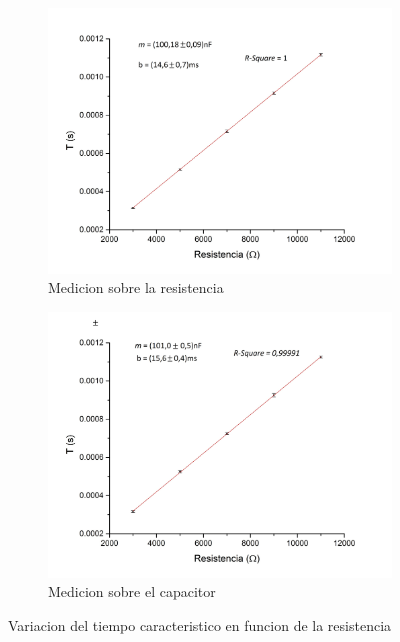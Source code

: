 \documentclass[11pt,a4paper]{article}
\begin{document}
\begin{figure}[H]

\begin{subfigure}{0.5\textwidth}
\includegraphics[scale=0.35]{Tau-RCvsR_Resistencia}
  \caption{Medicion sobre la resistencia}
  \label{subfig:RCvsRR}
\end{subfigure}
\begin{subfigure}{0.5\textwidth}
\includegraphics[scale=0.35]{Tau-RCvsR_Capacitor}
  \caption{Medicion sobre el capacitor}
  \label{subfig:RCvsRC}
\end{subfigure}
  \caption{Variacion del tiempo caracteristico en funcion de la resistencia}
  \label{fig:RCvsR}
\end{figure}
\end{document}

